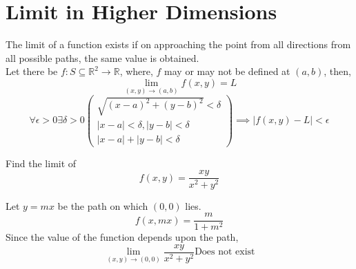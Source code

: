 \section{Limit in Higher Dimensions}
The limit of a function exists if on approaching the point from all directions from all possible paths, the same value is obtained.\\
Let there be $f:S\subseteq \mathbb{R}^2\to \mathbb{R}$, where, $f$ may or may not be defined at $(a,b)$, then,
\[\lim\limits_{(x,y)\to(a,b)} f(x,y)=L\]
\[\forall \epsilon>0 \exists \delta>0 (\begin{array}{l}
	\sqrt{(x-a)^2+(y-b)^2}<\delta\\
	|x-a|<\delta, |y-b|<\delta\\
	|x-a|+|y-b|<\delta
\end{array})\implies |f(x,y)-L|<\epsilon\]
\begin{eg}
	Find the limit of
	\[f(x,y)=\frac{xy}{x^2+y^2}\]
\end{eg}
\begin{explanation}
	Let $y=mx$ be the path on which $(0,0)$ lies.
	\[f(x,mx)=\frac{m}{1+m^2}\]
	Since the value of the function depends upon the path,
	\[\lim\limits_{(x,y)\to(0,0)}\frac{xy}{x^2+y^2} \text{Does not exist}\]
\end{explanation}

